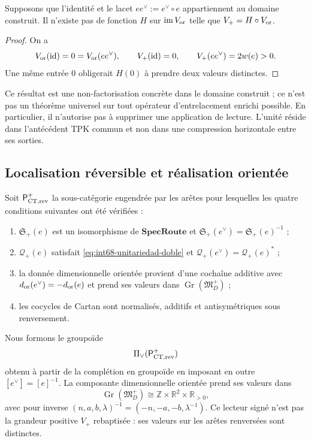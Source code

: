 \begin{proposition}
\label{prop:int68-no-factorizacion}
Supposons que l'identité et le lacet
\(ee^\vee:=e^\vee\circ e\) appartiennent au domaine construit. Il n'existe pas de
fonction \(H\) sur \(\operatorname{im}V_{\rm or}\) telle que
\(V_+=H\circ V_{\rm or}\).
\end{proposition}

\begin{proof}
On a
\[
 V_{\rm or}(\operatorname{id})=0
 =V_{\rm or}(ee^\vee),
 \qquad
 V_+(\operatorname{id})=0,
 \qquad
 V_+(ee^\vee)=2w(e)>0.
\]
Une même entrée \(0\) obligerait \(H(0)\) à prendre deux valeurs distinctes.
\end{proof}

Ce résultat est une non-factorisation concrète dans le domaine construit ; ce
n'est pas un théorème universel sur tout opérateur d'entrelacement enrichi possible.
En particulier, il n'autorise pas à supprimer une application de lecture. L'unité réside dans
l'antécédent TPK commun et non dans une compression horizontale entre ses sorties.

\subsection{Localisation réversible et réalisation orientée}

Soit \(\mathsf P_{{\rm CT},{\rm rev}}^+\) la sous-catégorie engendrée par les
arêtes pour lesquelles les quatre conditions suivantes ont été vérifiées :
\begin{enumerate}
 \item \(\mathfrak S_+(e)\) est un isomorphisme de
       \(\mathbf{SpecRoute}\) et
       \(\mathfrak S_+(e^\vee)=\mathfrak S_+(e)^{-1}\) ;
 \item \(\mathcal Q_+(e)\) satisfait
       \eqref{eq:int68-unitariedad-doble} et
       \(\mathcal Q_+(e^\vee)=\mathcal Q_+(e)^*\) ;
 \item la donnée dimensionnelle orientée provient d'une cochaîne additive avec
       \(d_{\rm or}(e^\vee)=-d_{\rm or}(e)\) et prend ses valeurs dans
       \(\operatorname{Gr}(\mathfrak M_D^+)\) ;
 \item les cocycles de Cartan sont normalisés, additifs et antisymétriques
       sous renversement.
\end{enumerate}
Nous formons le groupoïde
\[
 \Pi_\vee(\mathsf P_{{\rm CT},{\rm rev}}^+)
\]
obtenu à partir de la complétion en groupoïde en imposant en outre
\([e^\vee]=[e]^{-1}\). La composante dimensionnelle orientée prend ses valeurs dans
\begin{equation}
 \operatorname{Gr}(\mathfrak M_D^+)
 \cong\mathbb Z\times\mathbb R^2\times\mathbb R_{>0},
 \label{eq:int68-grothendieck-dimensional}
\end{equation}
avec pour inverse
\((n,a,b,\lambda)^{-1}=(-n,-a,-b,\lambda^{-1})\). Ce lecteur signé n'est pas
la grandeur positive \(V_+\) rebaptisée : ses valeurs sur les arêtes
renversées sont distinctes.

